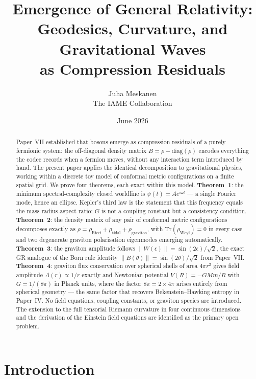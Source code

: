 \documentclass[11pt]{article}
\title{Emergence of General Relativity:\\
Geodesics, Curvature, and Gravitational Waves\\
as Compression Residuals}
\author{Juha Meskanen\\
\small The IAME Collaboration}
\date{June 2026}
\begin{document}
\maketitle

\begin{abstract}
Paper~VII established that bosons emerge as compression residuals of a
purely fermionic system: the off-diagonal density matrix
$B = \rho - \mathrm{diag}(\rho)$ encodes everything the codec records
when a fermion moves, without any interaction term introduced by hand.
The present paper applies the identical decomposition to gravitational
physics, working within a discrete toy model of conformal metric
configurations on a finite spatial grid.
We prove four theorems, each exact within this model.
\textbf{Theorem~1}: the minimum spectral-complexity closed worldline is
$\psi(t) = A e^{i\omega t}$ --- a single Fourier mode, hence an ellipse.
Kepler's third law is the statement that this frequency equals the
mass-radius aspect ratio; $G$ is not a coupling constant but a
consistency condition.
\textbf{Theorem~2}: the density matrix of any pair of conformal metric
configurations decomposes exactly as
$\rho = \rho_{\mathrm{Ricci}} + \rho_{\mathrm{tidal}} +
\rho_{\mathrm{graviton}}$, with $\mathrm{Tr}(\rho_{\mathrm{Weyl}}) = 0$
in every case and two degenerate graviton polarisation eigenmodes
emerging automatically.
\textbf{Theorem~3}: the graviton amplitude follows
$\|W(\epsilon)\| = \sin(2\epsilon)/\sqrt{2}$, the exact GR analogue of
the Born rule identity $\|B(\theta)\| = \sin(2\theta)/\sqrt{2}$ from
Paper~VII.
\textbf{Theorem~4}: graviton flux conservation over spherical shells of
area $4\pi r^2$ gives field amplitude $A(r) \propto 1/r$ exactly and
Newtonian potential $V(R) = -GMm/R$ with $G = 1/(8\pi)$ in Planck
units, where the factor $8\pi = 2 \times 4\pi$ arises entirely from
spherical geometry --- the same factor that recovers Bekenstein--Hawking
entropy in Paper~IV.
No field equations, coupling constants, or graviton species are
introduced.
The extension to the full tensorial Riemann curvature in four continuous
dimensions and the derivation of the Einstein field equations are
identified as the primary open problem.
\end{abstract}

\tableofcontents
\newpage

\section{Introduction}
\label{sec:intro}
\end{document}
